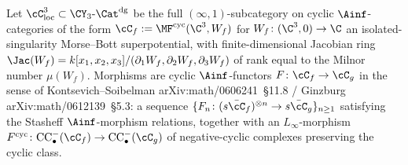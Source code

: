 \begin{definition}
\label{def:morse-bott-local-germ-locus}
Let $\cC_{\mathrm{loc}}^3 \subset \CY_3\text{-}\Cat^{\mathrm{dg}}$ be the
full $(\infty,1)$-subcategory on cyclic $\Ainf$-categories of the form
$\cC_f := \MF^{\mathrm{cyc}}(\C^3, W_f)$ for $W_f \colon (\C^3, 0) \to
\C$ an isolated-singularity Morse--Bott superpotential, with
finite-dimensional Jacobian ring
$\Jac(W_f) = k[x_1, x_2, x_3]/(\partial_1 W_f, \partial_2 W_f, \partial_3 W_f)$
of rank equal to the Milnor number $\mu(W_f)$. Morphisms are cyclic
$\Ainf$-functors $F \colon \cC_f \to \cC_g$ in the sense of
Kontsevich--Soibelman arXiv:math/0606241~\S11.8 / Ginzburg
arXiv:math/0612139~\S5.3: a sequence $\{F_n \colon (s\bar\cC_f)^{\otimes n}
\to s\bar\cC_g\}_{n \geq 1}$ satisfying the Stasheff $\Ainf$-morphism
relations, together with an $L_\infty$-morphism
$F^{\mathrm{cyc}} \colon \mathrm{CC}^-_\bullet(\cC_f) \to
\mathrm{CC}^-_\bullet(\cC_g)$ of negative-cyclic complexes preserving the
cyclic class.
\end{definition}


